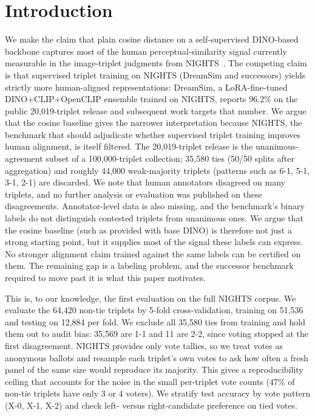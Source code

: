 \documentclass{article}
\begin{document}
\section{Introduction}

We make the claim that plain cosine distance on a self-supervised DINO-based backbone captures most of the human perceptual-similarity signal currently measurable in the image-triplet judgments from NIGHTS~\citep{fu2023dreamsim}. The competing claim is that supervised triplet training on NIGHTS (DreamSim and successors) yields strictly more human-aligned representations: DreamSim, a LoRA-fine-tuned DINO+CLIP+OpenCLIP ensemble trained on NIGHTS, reports 96.2\% on the public 20{,}019-triplet release and subsequent work targets that number. We argue that the cosine baseline gives the narrower interpretation because NIGHTS, the benchmark that should adjudicate whether supervised triplet training improves human alignment, is itself filtered. The 20{,}019-triplet release is the unanimous-agreement subset of a 100{,}000-triplet collection; 35{,}580 ties (50/50 splits after aggregation) and roughly 44{,}000 weak-majority triplets (patterns such as 6-1, 5-1, 3-1, 2-1) are discarded. We note that human annotators disagreed on many triplets, and no further analysis or evaluation was published on these disagreements. Annotator-level data is also missing, and the benchmark's binary labels do not distinguish contested triplets from unanimous ones. We argue that the cosine baseline (such as provided with base DINO) is therefore not just a strong starting point, but it supplies most of the signal these labels can express. No stronger alignment claim trained against the same labels can be certified on them. The remaining gap is a labeling problem, and the successor benchmark required to move past it is what this paper motivates.

This is, to our knowledge, the first evaluation on the full NIGHTS corpus. We evaluate the 64{,}420 non-tie triplets by 5-fold cross-validation, training on 51{,}536 and testing on 12{,}884 per fold. We exclude all 35{,}580 ties from training and hold them out to audit bias: 35{,}569 are 1-1 and 11 are 2-2, since voting stopped at the first disagreement. NIGHTS provides only vote tallies, so we treat votes as anonymous ballots and resample each triplet's own votes to ask how often a fresh panel of the same size would reproduce its majority. This gives a reproducibility ceiling that accounts for the noise in the small per-triplet vote counts (47\% of non-tie triplets have only 3 or 4 voters). We stratify test accuracy by vote pattern (X-0, X-1, X-2) and check left- versus right-candidate preference on tied votes.
\end{document}
